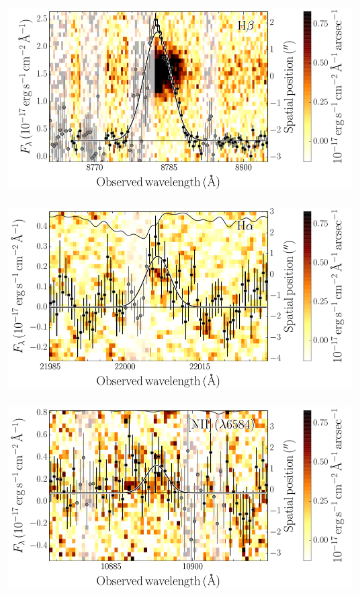 \documentclass[traditabstract, longauth]{aa}
\begin{document}
\begin{figure}
\begin{subfigure}{.33\textwidth}
\end{subfigure}
\begin{subfigure}{.33\textwidth}
  \includegraphics[width=0.999\linewidth]{Figs/Lines/GRB051022A_Hbeta_vis_2d.pdf}
\end{subfigure}
\begin{subfigure}{.33\textwidth}
  \includegraphics[width=0.999\linewidth]{Figs/Lines/GRB070110_Halpha_nir_2d.pdf}
\end{subfigure}
\begin{subfigure}{.33\textwidth}
  \includegraphics[width=0.999\linewidth]{Figs/Lines/GRB050416A_NII6584_nir_2d.pdf}

\end{subfigure}
\end{figure}
\end{document}
